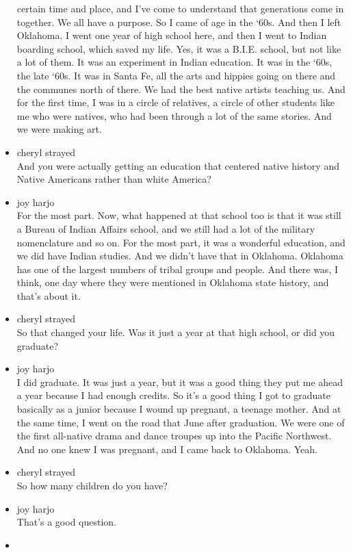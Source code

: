 \begin{itemize}
  certain time and place, and I've come to understand that generations
  come in together. We all have a purpose. So I came of age in the `60s.
  And then I left Oklahoma. I went one year of high school here, and
  then I went to Indian boarding school, which saved my life. Yes, it
  was a B.I.E. school, but not like a lot of them. It was an experiment
  in Indian education. It was in the `60s, the late `60s. It was in
  Santa Fe, all the arts and hippies going on there and the communes
  north of there. We had the best native artists teaching us. And for
  the first time, I was in a circle of relatives, a circle of other
  students like me who were natives, who had been through a lot of the
  same stories. And we were making art.
\item
  cheryl strayed\\
  And you were actually getting an education that centered native
  history and Native Americans rather than white America?
\item
  joy harjo\\
  For the most part. Now, what happened at that school too is that it
  was still a Bureau of Indian Affairs school, and we still had a lot of
  the military nomenclature and so on. For the most part, it was a
  wonderful education, and we did have Indian studies. And we didn't
  have that in Oklahoma. Oklahoma has one of the largest numbers of
  tribal groups and people. And there was, I think, one day where they
  were mentioned in Oklahoma state history, and that's about it.
\item
  cheryl strayed\\
  So that changed your life. Was it just a year at that high school, or
  did you graduate?
\item
  joy harjo\\
  I did graduate. It was just a year, but it was a good thing they put
  me ahead a year because I had enough credits. So it's a good thing I
  got to graduate basically as a junior because I wound up pregnant, a
  teenage mother. And at the same time, I went on the road that June
  after graduation. We were one of the first all-native drama and dance
  troupes up into the Pacific Northwest. And no one knew I was pregnant,
  and I came back to Oklahoma. Yeah.
\item
  cheryl strayed\\
  So how many children do you have?
\item
  joy harjo\\
  That's a good question.
\item

\end{itemize}
